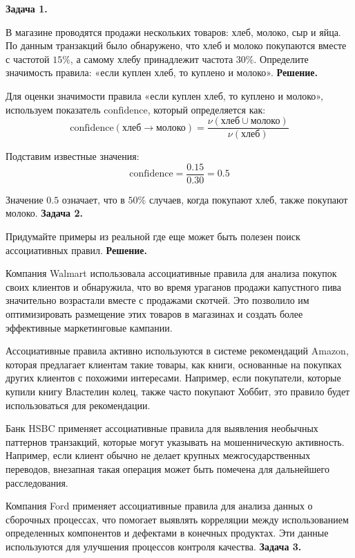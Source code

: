 \textbf{Задача 1.}

В магазине проводятся продажи нескольких товаров: хлеб, молоко, сыр и яйца. По данным транзакций было обнаружено, что хлеб и молоко покупаются вместе с частотой $15\%$, а самому хлебу принадлежит частота $30\%$. Определите значимость правила: «если куплен хлеб, то куплено и молоко».
\newline
\textbf{Решение.}

Для оценки значимости правила «если куплен хлеб, то куплено и молоко», используем показатель \(\text{confidence}\), который определяется как:
\[
\text{confidence}(\text{хлеб} \rightarrow \text{молоко}) = \frac{\nu(\text{хлеб} \cup \text{молоко})}{\nu(\text{хлеб})}
\]

Подставим известные значения:
\[
\text{confidence} = \frac{0.15}{0.30} = 0.5
\]

Значение $0.5$ означает, что в $50\%$ случаев, когда покупают хлеб, также покупают молоко.
\newline
\textbf{Задача 2.}

Придумайте примеры из реальной где еще может быть полезен поиск ассоциативных правил.
\newline
\textbf{Решение.}

Компания Walmart использовала ассоциативные правила для анализа покупок своих клиентов и обнаружила, что во время ураганов продажи капустного пива значительно возрастали вместе с продажами скотчей. Это позволило им оптимизировать размещение этих товаров в магазинах и создать более эффективные маркетинговые кампании.

Ассоциативные правила активно используются в системе рекомендаций Amazon, которая предлагает клиентам такие товары, как книги, основанные на покупках других клиентов с похожими интересами. Например, если покупатели, которые купили книгу Властелин колец, также часто покупают Хоббит, это правило будет использоваться для рекомендации.

Банк HSBC применяет ассоциативные правила для выявления необычных паттернов транзакций, которые могут указывать на мошенническую активность. Например, если клиент обычно не делает крупных межгосударственных переводов, внезапная такая операция может быть помечена для дальнейшего расследования.

Компания Ford применяет ассоциативные правила для анализа данных о сборочных процессах, что помогает выявлять корреляции между использованием определенных компонентов и дефектами в конечных продуктах. Эти данные используются для улучшения процессов контроля качества.
\newline
\textbf{Задача 3.}

